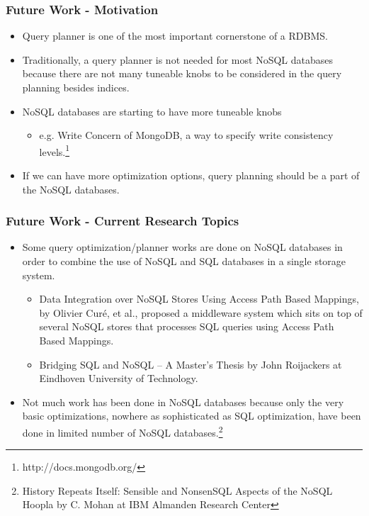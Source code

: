\documentclass{beamer}
\begin{document}
\begin{frame}
  \frametitle{Future Work - Motivation}
  \begin{itemize}
  \item Query planner is one of the most important cornerstone of a RDBMS.
  \item Traditionally, a query planner is not needed for most NoSQL databases
    because there are not many tuneable knobs to be considered in the query
    planning besides indices.
  \item NoSQL databases are starting to have more tuneable knobs
    \begin{itemize}
    \item e.g. Write Concern of MongoDB, a way to specify write consistency
      levels.\footnote{http://docs.mongodb.org/}
    \end{itemize}
  \item If we can have more optimization options, query planning should be a
    part of the NoSQL databases.
  \end{itemize}
\end {frame}

\begin{frame}
  \frametitle{Future Work - Current Research Topics}
  \begin{itemize}
  \item Some query optimization/planner works are done on NoSQL databases in
    order to combine the use of NoSQL and SQL databases in a single storage
    system.
    \begin{itemize}
    \item Data Integration over NoSQL Stores Using Access Path Based Mappings,
      by Olivier Curé, et al., proposed a middleware system which sits on top
      of several NoSQL stores that processes SQL queries using Access Path
      Based Mappings.
    \item Bridging SQL and NoSQL -- A Master's Thesis by John Roijackers at
      Eindhoven University of Technology.
    \end{itemize}
  \item Not much work has been done in NoSQL databases because only the very
    basic optimizations, nowhere as sophisticated as SQL optimization, have
    been done in limited number of NoSQL databases.\footnote{History Repeats
      Itself: Sensible and NonsenSQL Aspects of the NoSQL Hoopla by C. Mohan at
      IBM Almanden Research Center}
  \end{itemize}
\end{frame}
\end{document}
